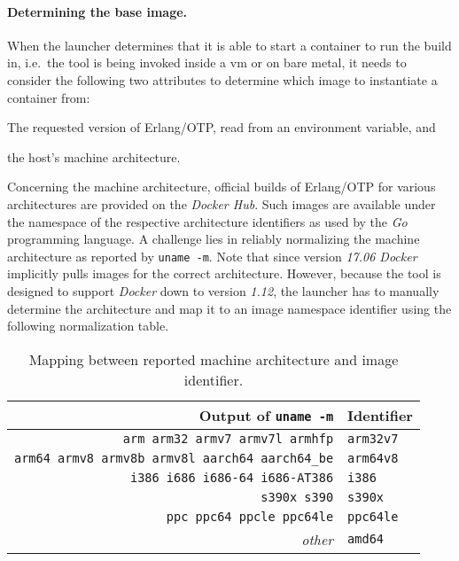 \paragraph{Determining the base image.} When the launcher determines that it is able to start a container to run the build in, i.e.~the tool is being invoked inside a \acrshort{vm} or on bare metal, it needs to consider the following two attributes to determine which image to instantiate a container from:
\begin{enumerate*}[label=(\roman*)]
  \item The requested version of Erlang/OTP, read from an environment variable, and
  \item the host's machine architecture.
\end{enumerate*}

Concerning the machine architecture, official builds of Erlang/OTP for various architectures are provided on the \emph{Docker Hub}. Such images are available under the namespace of the respective architecture identifiers as used by the \emph{Go} programming language. A challenge lies in reliably normalizing the machine architecture as reported by \lstinline|uname -m|. Note that since version \emph{17.06 Docker} implicitly pulls images for the correct architecture. However, because the tool is designed to support \emph{Docker} down to version \emph{1.12}, the launcher has to manually determine the architecture and map it to an image namespace identifier using the following normalization table.

\begin{table}[h]
  \setlength{\tabcolsep}{10pt}
  \centering
  \begin{tabular}{ r l }
    Output of \lstinline|uname -m| & Identifier \\
    \hline
    \lstinline|arm arm32 armv7 armv7l armhfp| & \lstinline|arm32v7| \\
    \lstinline|arm64 armv8 armv8b armv8l aarch64 aarch64_be| & \lstinline|arm64v8| \\
    \lstinline|i386 i686 i686-64 i686-AT386| & \lstinline|i386| \\
    \lstinline|s390x s390| & \lstinline|s390x| \\
    \lstinline|ppc ppc64 ppcle ppc64le| & \lstinline|ppc64le| \\
    \emph{other} & \lstinline|amd64| \\
  \end{tabular}
  \caption{Mapping between reported machine architecture and image identifier.}
\end{table}

